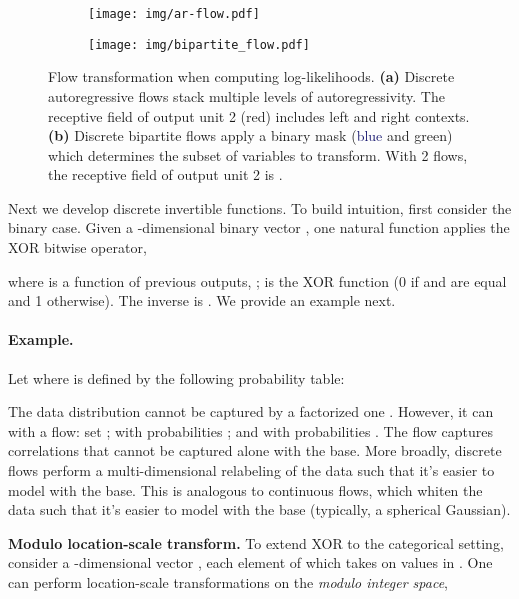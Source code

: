 \documentclass{article}
\newcommand{\red}[1]{\textcolor{BrickRed}{#1}}
\newcommand{\green}[1]{\textcolor{OliveGreen}{#1}}
\newcommand{\blue}[1]{\textcolor{MidnightBlue}{#1}}
\begin{document}
\begin{figure}[t!]
\centering
\begin{subfigure}[t]{0.3\textwidth}
\centering
\texttt{[image: img/ar-flow.pdf]}
\end{subfigure}\hspace{5em}\begin{subfigure}[t]{0.3\textwidth}
\centering
\texttt{[image: img/bipartite\_flow.pdf]}
\end{subfigure}\hfill \caption{Flow transformation when computing log-likelihoods.
\textbf{(a)} Discrete autoregressive flows stack multiple levels of autoregressivity.
The receptive field of output unit 2 (\red{red}) includes left and right contexts.
\textbf{(b)} Discrete bipartite flows apply a binary mask (\blue{blue} and \green{green}) which determines the subset of variables to transform.
With 2 flows, the receptive field of output unit 2 is .
}
\label{fig:flow-transformations}
\end{figure}

Next we develop discrete invertible functions. To build intuition, first consider the binary case.
Given a -dimensional binary vector , one natural function applies the XOR bitwise operator,

where  is a function of previous outputs, ;  is the XOR function (0 if  and  are equal and 1 otherwise).
The inverse is . We provide an example next.

\paragraph{Example.}
Let  where  is defined by the following probability table:

The data distribution cannot be captured by a factorized one . However, it can with a flow: set ;
 with probabilities ; and  with probabilities .
The flow captures correlations that cannot be captured alone with the base.
More broadly, discrete flows perform a multi-dimensional relabeling of the data
such that it's easier to model with the base. This is analogous to continuous flows, which whiten the data such that it's easier to model with the base (typically, a spherical Gaussian).

\textbf{Modulo location-scale transform.}
To extend XOR to the categorical setting,
consider a -dimensional vector , each element of which takes on values in . One can perform location-scale transformations on the \emph{modulo integer space},
\end{document}
